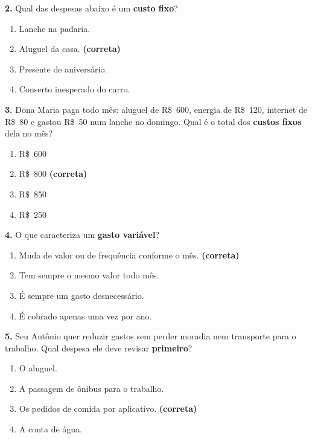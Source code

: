 \vspace{0.3cm}
\noindent\textbf{2.} Qual das despesas abaixo é um \textbf{custo fixo}?
\begin{enumerate}
    \item[(a)] Lanche na padaria.
    \item[(b)] Aluguel da casa. \textbf{(correta)}
    \item[(c)] Presente de aniversário.
    \item[(d)] Conserto inesperado do carro.
\end{enumerate}

\vspace{0.3cm}
\noindent\textbf{3.} Dona Maria paga todo mês: aluguel de R\$~600, energia de R\$~120,
internet de R\$~80 e gastou R\$~50 num lanche no domingo. Qual é o total dos \textbf{custos
fixos} dela no mês?
\begin{enumerate}
    \item[(a)] R\$~600
    \item[(b)] R\$~800 \textbf{(correta)}
    \item[(c)] R\$~850
    \item[(d)] R\$~250
\end{enumerate}

\vspace{0.3cm}
\noindent\textbf{4.} O que caracteriza um \textbf{gasto variável}?
\begin{enumerate}
    \item[(a)] Muda de valor ou de frequência conforme o mês. \textbf{(correta)}
    \item[(b)] Tem sempre o mesmo valor todo mês.
    \item[(c)] É sempre um gasto desnecessário.
    \item[(d)] É cobrado apenas uma vez por ano.
\end{enumerate}

\vspace{0.3cm}
\noindent\textbf{5.} Seu Antônio quer reduzir gastos sem perder moradia nem transporte para o
trabalho. Qual despesa ele deve revisar \textbf{primeiro}?
\begin{enumerate}
    \item[(a)] O aluguel.
    \item[(b)] A passagem de ônibus para o trabalho.
    \item[(c)] Os pedidos de comida por aplicativo. \textbf{(correta)}
    \item[(d)] A conta de água.
\end{enumerate}

